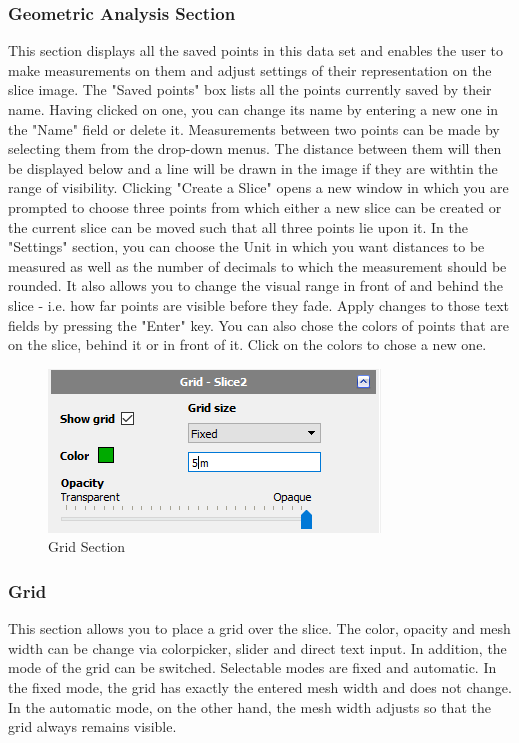 \subsubsection{Geometric Analysis Section}

This section displays all the saved points in this data set and enables the user to make measurements on them and adjust settings of their representation on the slice image. The "Saved points" box lists all the points currently saved by their name. Having clicked on one, you can change its name by entering a new one in the "Name" field or delete it. Measurements between two points can be made by selecting them from the drop-down menus. The distance between them will then be displayed below and a line will be drawn in the image if they are withtin the range of visibility. 
\newline Clicking "Create a Slice" opens a new window in which you are prompted to choose three points from which either a new slice can be created or the current slice can be moved such that all three points lie upon it. 
\newline In the "Settings" section, you can choose the Unit in which you want distances to be measured as well as the number of decimals to which the measurement should be rounded. It also allows you to change the visual range in front of and behind the slice - i.e. how far points are visible before they fade. Apply changes to those text fields by pressing the "Enter" key. You can also chose the colors of points that are on the slice, behind it or in front of it. Click on the colors to chose a new one.

\begin{figure}[h!]
  \centering
  \includegraphics[scale=1.0]{img/2d/grid}
  \caption{Grid Section}
\end{figure}

\subsubsection{Grid}

This section allows you to place a grid over the slice. The color, opacity and mesh width can be change via colorpicker, slider and direct text input. In addition, the mode of the grid can be switched. Selectable modes are fixed and automatic. In the fixed mode, the grid has exactly the entered mesh width and does not change. In the automatic mode, on the other hand, the mesh width adjusts so that the grid always remains visible. 

